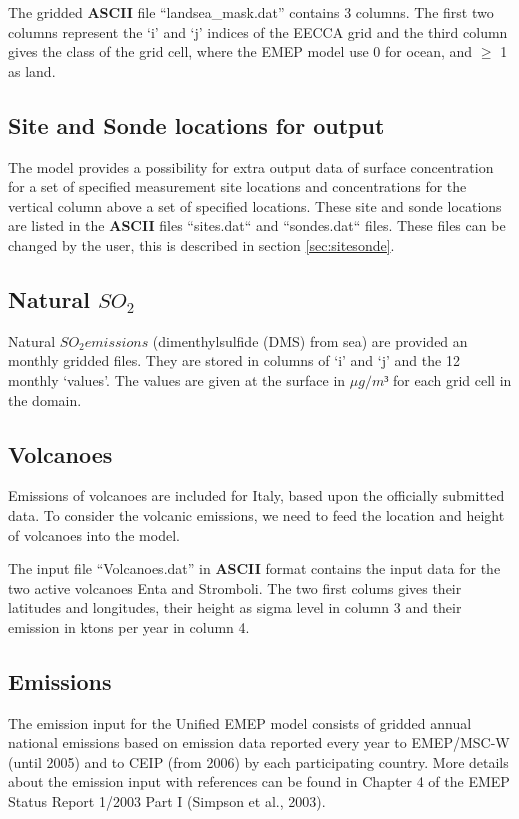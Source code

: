 The gridded {\bf ASCII} file ``landsea\_mask.dat'' contains 3 columns. 
The first two columns represent the `i' and `j' indices of the EECCA
grid and the third column gives the class of the grid cell, where the 
EMEP model use 0 for ocean, and $\geq$ 1 as land.%

\subsection{Site and Sonde locations for output}\label{sec:sitessondes_input}
The model provides a possibility for extra output data of surface concentration 
for a set of specified measurement site locations and concentrations for the vertical 
column above a set of specified locations. These site and sonde locations are listed 
in the {\bf ASCII} files ``sites.dat`` and ``sondes.dat`` files. These files can be 
changed by the user, this is described in section \ref{sec:sitesonde}.


\subsection{Natural $SO_2$}
Natural $SO_2 emissions$ (dimenthylsulfide (DMS) from sea) are provided 
an monthly gridded files. They are stored in columns of `i' and `j' and the 12 monthly `values'. 
The values are given at the surface in $\mu g /m³ $ for each grid cell in the domain. 

\subsection{Volcanoes}

Emissions of volcanoes are included for Italy, based upon the
officially submitted data.
To consider the volcanic emissions, we need to feed the location
and height of volcanoes into the model. 

The input file ``Volcanoes.dat'' in {\bf ASCII} format contains the input data for the two active volcanoes
 Enta and Stromboli. The two first colums gives their latitudes and longitudes, their height as sigma level
 in column 3 and their emission in ktons per year in column 4. 

\subsection{Emissions}
The emission input for the Unified EMEP model consists of gridded
annual national emissions based on emission data reported every year
to EMEP/MSC-W (until 2005) 
and to CEIP (from 2006) by each
participating country. 
More details about the emission input with references can be
found in Chapter 4 of the EMEP Status Report 1/2003 Part I 
(Simpson et al., 2003).

